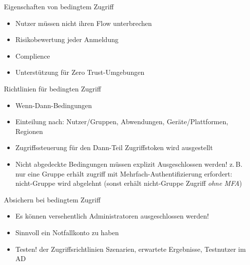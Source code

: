 \begin{flashcard}[Definition]{Eigenschaften von bedingtem Zugriff}
  \begin{itemize}
    \item Nutzer müssen nicht ihren Flow unterbrechen
    \item Risikobewertung jeder Anmeldung
    \item Complience
    \item Unterstützung für Zero Trust-Umgebungen
  \end{itemize}
\end{flashcard}

\begin{flashcard}[Definition]{Richtlinien für bedingten Zugriff}
  \begin{itemize}
    \item Wenn-Dann-Bedingungen
    \item Einteilung nach:\newline
      Nutzer/Gruppen, Abwendungen, Geräte/Plattformen, Regionen
    \item Zugriffssteuerung für den Dann-Teil\newline
      Zugriffstoken wird ausgestellt
    \item Nicht abgedeckte Bedingungen müssen explizit Ausgeschlossen werden!\newline
      z.\,B. nur eine Gruppe erhält zugriff mit Mehrfach-Authentifizierung erfordert:\newline
      nicht-Gruppe wird abgelehnt (sonst erhält nicht-Gruppe Zugriff \emph{ohne MFA})
  \end{itemize}
\end{flashcard}

\begin{flashcard}[Definition]{Absichern bei bedingtem Zugriff}
  \begin{itemize}
    \item Es können versehentlich Administratoren ausgeschlossen werden!
    \item Sinnvoll ein Notfallkonto zu haben
    \item Testen! der Zugriffsrichtlinien\newline
      Szenarien, erwartete Ergebnisse, Testnutzer im AD
  \end{itemize}
\end{flashcard}


